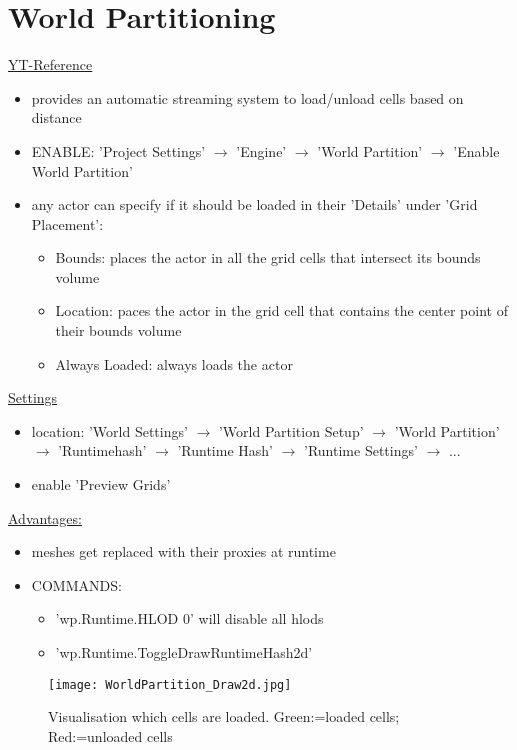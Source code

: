 \chapter{World Partitioning}
    \href{https://www.youtube.com/watch?v=ZxJ5DG8Ytog}{YT-Reference}
    \begin{itemize}
        \item provides an automatic streaming system to load/unload cells based on distance
        \item ENABLE: 'Project Settings' $\rightarrow$ 'Engine' $\rightarrow$ 'World Partition' $\rightarrow$ 'Enable World Partition'
        \item any actor can specify if it should be loaded in their 'Details' under 'Grid Placement':
        \begin{itemize}
            \item Bounds: places the actor in all the grid cells that intersect its bounds volume
            \item Location: paces the actor in the grid cell that contains the center point of their bounds volume
            \item Always Loaded: always loads the actor
        \end{itemize}
    \end{itemize}
    \uline{Settings}
    \begin{itemize}
        \item location: 'World Settings' $\rightarrow$ 'World Partition Setup'
        $\rightarrow$ 'World Partition'
        $\rightarrow$ 'Runtimehash'
        $\rightarrow$ 'Runtime Hash'
        $\rightarrow$ 'Runtime Settings' $\rightarrow$ ...
        \item enable 'Preview Grids'
    \end{itemize}
    \uline{Advantages:}
    \begin{itemize}
        \item meshes get replaced with their proxies at runtime
        \item COMMANDS:
        \begin{itemize}
            \item 'wp.Runtime.HLOD 0' will disable all hlods
            \item 'wp.Runtime.ToggleDrawRuntimeHash2d'
        \end{itemize} 
    \end{itemize}
    \begin{figure}
        \texttt{[image: WorldPartition\_Draw2d.jpg]}
        \caption{Visualisation which cells are loaded. Green:=loaded cells; Red:=unloaded cells}
    \end{figure}

